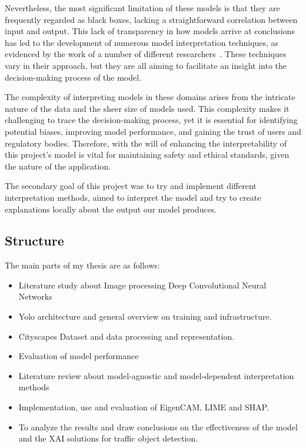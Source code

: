 \documentclass[11pt,a4paper,twoside,openright]{report}  %
\begin{document}
Nevertheless, the most significant limitation of these models is that they are frequently regarded as black boxes, lacking a straightforward correlation between input and output.
This lack of transparency in how models arrive at conclusions has led to the development of numerous model interpretation techniques, as evidenced by the work of a number of different researchers~\cite{LIANG2021168}.
These techniques vary in their approach, but they are all aiming to facilitate an insight into the decision-making process of the model.

The complexity of interpreting models in these domains arises from the intricate nature of the data and the sheer size of models used.
This complexity makes it challenging to trace the decision-making process, yet it is essential for identifying potential biases,
improving model performance, and gaining the trust of users and regulatory bodies.
Therefore, with the will of enhancing the interpretability of this project's model is vital for maintaining safety and ethical standards, given the nature of the application.

The secondary goal of this project was to try and implement different interpretation methods,
aimed to interpret the model and try to create explanations locally about the output our model produces.


\subsection{Structure}\label{subsec:Structure} %

The main parts of my thesis are as follows:

\begin{itemize}
    \item Literature study about Image processing Deep Convolutional Neural Networks
    \item Yolo architecture and general overview on training and infrastructure.
    \item Cityscapes Dataset and data processing and representation.
    \item Evaluation of model performance
    \item Literature review about model-agnostic and  model-dependent interpretation methods
    \item Implementation, use and evaluation of EigenCAM, LIME and SHAP.
    \item To analyze the results and draw conclusions on the effectiveness of the model and the XAI solutions for traffic object detection.
\end{itemize}
\end{document}
